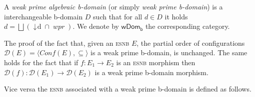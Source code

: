 \documentclass[conference]{IEEEtran}
\newcommand{\wi}{{interchangeable}}
\newcommand{\principal}[1]{\ensuremath{\mathop{\downarrow\!{#1}}}}
\newcommand{\wpr}[1]{\ensuremath{\mathop{\mathit{wpr}({#1})}}}
\newcommand{\esnabbr}{\textsc{esnb}}
\newcommand{\WDomb}{\ensuremath{\mathsf{wDom_b}}}
\newcommand{\conf}[1]{\ensuremath{\mathit{Conf}({#1})}}
\newcommand{\zdom}[0]{\ensuremath{\mathcal{D}}}
\newcommand{\dom}[1]{\ensuremath{\zdom({#1})}}
\begin{document}


\begin{definition}
  \label{a-de:fusion-domain-new}
  A \emph{weak prime algebraic b-domain} (or simply \emph{weak prime
    b-domain}) is a {\wi} b-domain $D$ such that for all $d \in D$ it
  holds $d = \bigsqcup (\principal{d} \cap \wpr{D})$. We denote by
  $\WDomb$ the corresponding category.
\end{definition}


The proof of the fact that, given an {\esnabbr} ${E}$, the partial order of
configurations $\dom{{E}} = \langle \conf{{E}}, \subseteq \rangle$ is
a weak prime b-domain, is unchanged. The same holds for the fact that
if $f : E_1 \to E_2$ is an {\esnabbr} morphism then
$\dom{f} : \dom{{E}_1} \to \dom{{E}_2}$ is a weak prime b-domain
morphism.


Vice versa the {\esnabbr} associated with a
weak prime b-domain is defined as follows.
\end{document}
